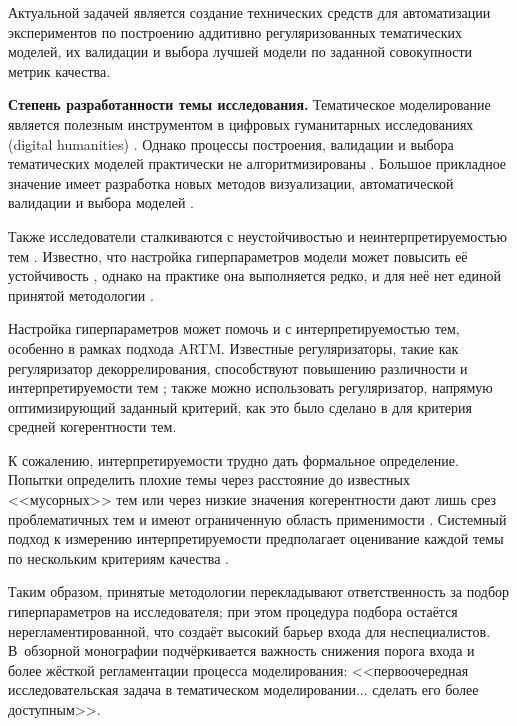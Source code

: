 Актуальной задачей является создание технических средств для автоматизации экспериментов по построению аддитивно регуляризованных тематических моделей, их валидации и выбора лучшей модели по заданной совокупности метрик качества.  

\textbf{Степень разработанности темы исследования.} 
Тематическое моделирование является полезным инструментом в цифровых гуманитарных исследованиях (digital humanities) \cite{grimmer2013text,paakkonen2020humanistic}. Однако процессы построения, валидации и выбора тематических моделей практически не алгоритмизированы \cite{paakkonen2020humanistic}. Большое прикладное значение имеет разработка новых методов визуализации, автоматической валидации и выбора моделей \cite{dh_sea}. 

Также исследователи сталкиваются с неустойчивостью \cite{mantyla2018measuring} и неинтерпретируемостью тем \cite{boydcare}. Известно, что настройка гиперпараметров модели может повысить её устойчивость \cite{agrawal2018wrong}, однако на практике она выполняется редко, и для неё нет единой принятой методологии  \cite{agrawal2018wrong,chen2016survey}. 

Настройка гиперпараметров может помочь и с интерпретируемостью тем, особенно в рамках подхода ARTM. Известные регуляризаторы, такие как регуляризатор декоррелирования, способствуют повышению различности и интерпретируемости тем \cite{popov_hier}; также можно использовать  регуляризатор, напрямую оптимизирующий заданный критерий, как это было сделано в \cite{4keys} для критерия средней когерентности тем. 

К сожалению, интерпретируемости трудно дать формальное определение. Попытки определить плохие темы через расстояние до известных <<мусорных>> тем или через низкие значения когерентности дают лишь срез проблематичных тем и имеют ограниченную область применимости \cite{boydcare}. Системный подход к измерению интерпретируемости предполагает оценивание каждой темы по нескольким критериям качества \cite{fan2019assessing}. 

Таким образом, принятые методологии перекладывают ответственность за подбор гиперпараметров на исследователя; при этом процедура подбора остаётся нерегламентированной, что создаёт высокий барьер входа для неспециалистов.  
В~обзорной монографии \cite{fntir2017applications} подчёркивается важность снижения порога входа и более жёсткой регламентации процесса моделирования: <<первоочередная исследовательская задача в тематическом моделировании... сделать его более доступным>>. 


